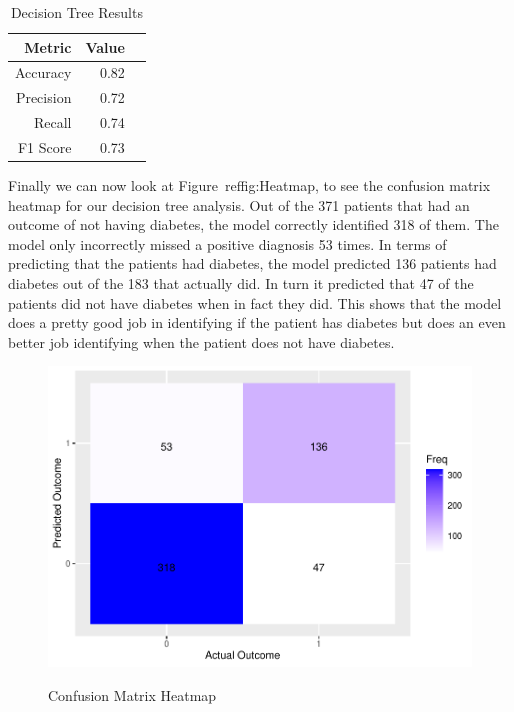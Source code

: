 \documentclass[12pt]{article}
\begin{document}
\begin{table}[ht]
  \centering
  \caption{Decision Tree Results}
  \label{tab:dtr} 
  \begin{tabular}{rrr}
    \toprule
    Metric & Value\\
    \midrule
    Accuracy & 0.82\\
    Precision & 0.72\\
    Recall & 0.74\\
    F1 Score & 0.73\\
    \bottomrule
  \end{tabular}
\end{table}

Finally we can now look at Figure~ref{fig:Heatmap}, to see the confusion matrix heatmap for our decision tree analysis. Out of the 371 patients that had an outcome
of not having diabetes, the model correctly identified 318 of them. The model only incorrectly missed a positive diagnosis 53 times. 
In terms of predicting that the patients had diabetes, the model predicted 136 patients had diabetes out of the 183 that actually did. In turn it predicted that 47 of the
patients did not have diabetes when in fact they did. This shows that the model does a pretty good job in identifying if the patient has diabetes but does an even better job
identifying when the patient does not have diabetes.  

\begin{figure}[tbp]
  \centering
  \caption{Confusion Matrix Heatmap}
  \includegraphics[width=\textwidth]{Confusion Matrix Heatmap.pdf}
  \label{fig:Heatmap}
\end{figure}
\end{document}
